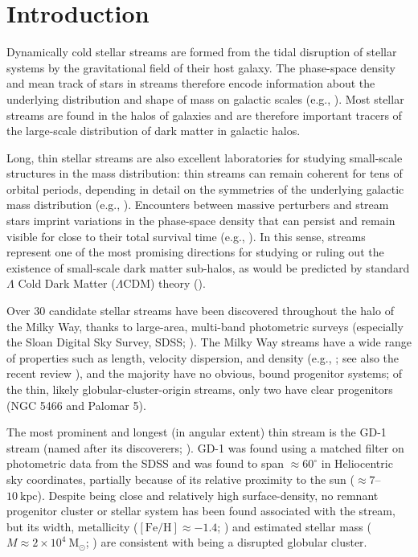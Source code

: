 \documentclass[modern]{aastex62}
\newcommand{\msun}{\textrm{M}_\odot}
\newcommand{\feh}{\ensuremath{[\textrm{Fe} / \textrm{H}]}}
\begin{document}
\section{Introduction}
\label{sec:intro}

Dynamically cold stellar streams are formed from the tidal disruption of stellar
systems by the gravitational field of their host galaxy.
The phase-space density and mean track of stars in streams therefore encode
information about the underlying distribution and shape of mass on galactic
scales (e.g., \citealt{Johnston:1999, Bonaca:2018}).
Most stellar streams are found in the halos of galaxies and are therefore
important tracers of the large-scale distribution of dark matter in galactic
halos.

Long, thin stellar streams are also excellent laboratories for studying
small-scale structures in the mass distribution:
thin streams can remain coherent for tens of orbital periods, depending in
detail on the symmetries of the underlying galactic mass distribution (e.g.,
\citealt{Erkal:2016a}).
Encounters between massive perturbers and stream stars imprint variations in the
phase-space density that can persist and remain visible for close to their total
survival time (e.g., \citealt{Yoon:2011}).
In this sense, streams represent one of the most promising directions for
studying or ruling out the existence of small-scale dark matter sub-halos, as
would be predicted by standard $\Lambda$ Cold Dark Matter ($\Lambda$CDM) theory
(\citealt{Erkal:2015, Sanders:2016, Bovy:2017}).

Over 30 candidate stellar streams have been discovered throughout the halo of
the Milky Way, thanks to large-area, multi-band photometric surveys (especially
the Sloan Digital Sky Survey, SDSS; \citealt{York:2000}).
The Milky Way streams have a wide range of properties such as length, velocity
dispersion, and density (e.g., \citealt{Odenkirchen:2001, Grillmair:2006,
Grillmair:2006b, Belokurov:2006, Belokurov:2007, Bonaca:2012, Shipp:2018}; see
also the recent review \citealt{Grillmair:2016, Newberg:2016}), and the majority
have no obvious, bound progenitor systems;
of the thin, likely globular-cluster-origin streams, only two have clear
progenitors (NGC 5466 and Palomar 5).

The most prominent and longest (in angular extent) thin stream is the GD-1
stream (named after its discoverers; \citealt{Grillmair:2006}).
GD-1 was found using a matched filter on photometric data from the SDSS and
was found to span $\approx 60^\circ$ in Heliocentric sky coordinates, partially
because of its relative proximity to the sun ($\approx 7$--$10~\textrm{kpc}$).
Despite being close and relatively high surface-density, no remnant progenitor
cluster or stellar system has been found associated with the stream, but its
width,  metallicity ($\feh \approx -1.4$; \citealt{Koposov:2010}) and estimated
stellar mass ($M \approx 2 \times 10^4~\msun$; \citealt{Koposov:2010}) are
consistent with being a disrupted globular cluster.
\end{document}
